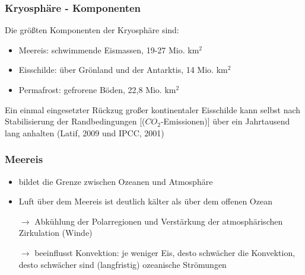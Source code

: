 \begin{frame}
	\frametitle{Kryosphäre - Komponenten}
	Die größten Komponenten der Kryosphäre sind:
	\begin{itemize}
		\item Meereis: schwimmende Eismassen, 19-27 Mio. km$^2$
		\item Eisschilde: über Grönland und der Antarktis, 14 Mio. km$^2$
		\item Permafrost: gefrorene Böden, 22,8 Mio. km$^2$
	\end{itemize}

	\glqq Ein einmal eingesetzter Rückzug großer kontinentaler Eisschilde kann selbst nach Stabilisierung der Randbedingungen [($CO_2$-Emissionen)] über ein Jahrtausend lang anhalten\grqq{} (Latif, 2009 und IPCC, 2001)\\

\end{frame}

\begin{frame}
	\frametitle{Meereis} %
	\begin{itemize}
		\item bildet die Grenze zwischen Ozeanen und Atmosphäre
		\item Luft über dem Meereis ist deutlich kälter als über dem offenen Ozean
		\item [$\rightarrow$] Abkühlung der Polarregionen und Verstärkung der atmosphärischen Zirkulation (Winde)
		\item [$\rightarrow$] beeinflusst Konvektion: je weniger Eis, desto schwächer die Konvektion, desto schwächer sind (langfristig) ozeanische Strömungen
	\end{itemize}

\end{frame}

